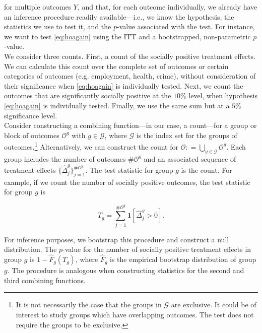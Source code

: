 \noindent for multiple outcomes $Y$, and that, for each outcome individually, we already have an inference procedure readily available---i.e., we know the hypothesis, the statistics we use to test it, and the $p$-value associated with the test. For instance, we want to test \eqref{eq:hoagain} using the ITT and a bootstrapped, non-parametric $p$-value.\\

\noindent We consider three counts. First, a count of the socially positive treatment effects. We can calculate this count over the complete set of outcomes or certain categories of outcomes (e.g. employment, health, crime), without consideration of their significance when \eqref{eq:hoagain} is individually tested. Next, we count the outcomes that are significantly socially positive at the $10\%$ level, when hypothesis \eqref{eq:hoagain} is individually tested. Finally, we use the same sum but at a $5\%$ significance level.\\

\noindent Consider constructing a combining function---in our case, a count---for a group or block of outcomes $\mathcal{O}^g$ with $g \in \mathcal{G}$, where $\mathcal{G}$ is the index set for the groups of outcomes.\footnote{It is not necessarily the case that the groups in $\mathcal{G}$ are exclusive. It could be of interest to study groups which have overlapping outcomes. The test does not require the groups to be exclusive.} Alternatively, we can construct the count for $\mathcal{O} : =  \bigcup \limits _{g \in \mathcal{G}} \mathcal{O}^g$. Each group includes the number of outcomes $\# \mathcal{O}^g$ and an associated sequence of treatment effects $\{ \widehat{\Delta}_{j}^{g} \}_{j = 1}^{\# \mathcal{O}^g}$. The test statistic for group $g$ is the count. For example, if we count the number of socially positive outcomes, the test statistic for group $g$ is 

\begin{equation}
T_{g} = \sum _{j=1}^{\# \mathcal{O}^g} \mathbf{1} \left[ \widehat{\Delta}_{j}^{g} > 0\right]. 
\end{equation} 

\noindent For inference purposes, we bootstrap this procedure and construct a null distribution. The $p$-value for the number of socially positive treatment effects in group $g$ is $1 - \widehat{F}_{g} \left( T_{g} \right)$, where $ \widehat{F}_{g}$ is the empirical bootstrap distribution of group $g$. The procedure is analogous when constructing statistics for the second and third combining functions.\\

